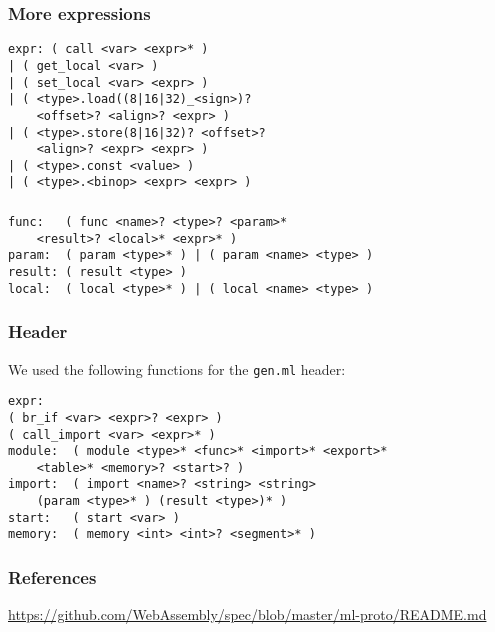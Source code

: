 \documentclass{beamer}
\begin{document}

\begin{frame}[fragile]
\frametitle{More expressions}

\begin{verbatim}
expr: ( call <var> <expr>* )
| ( get_local <var> )
| ( set_local <var> <expr> )
| ( <type>.load((8|16|32)_<sign>)?
	<offset>? <align>? <expr> )
| ( <type>.store(8|16|32)? <offset>?
	<align>? <expr> <expr> )
| ( <type>.const <value> )
| ( <type>.<binop> <expr> <expr> )

\end{verbatim}

\end{frame}



\begin{frame}[fragile]
\frametitle{}

\begin{verbatim}
func:   ( func <name>? <type>? <param>*
	<result>? <local>* <expr>* )
param:  ( param <type>* ) | ( param <name> <type> )
result: ( result <type> )
local:  ( local <type>* ) | ( local <name> <type> )

\end{verbatim}

\end{frame}



\begin{frame}[fragile]
\frametitle{Header}

We used the following functions for the \texttt{gen.ml} header:
\begin{verbatim}
expr:
( br_if <var> <expr>? <expr> )
( call_import <var> <expr>* )
module:  ( module <type>* <func>* <import>* <export>*
	<table>* <memory>? <start>? )
import:  ( import <name>? <string> <string>
	(param <type>* ) (result <type>)* )
start:   ( start <var> )
memory:  ( memory <int> <int>? <segment>* )

\end{verbatim}

\end{frame}

\begin{frame}
\frametitle{References}
\url{https://github.com/WebAssembly/spec/blob/master/ml-proto/README.md}
\end{frame}
\end{document}

